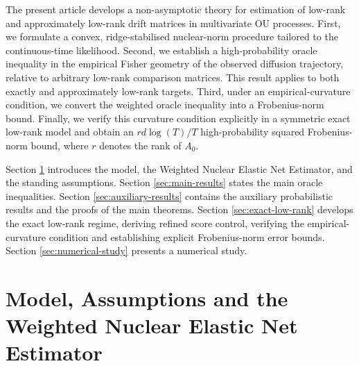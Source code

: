 \documentclass[11pt]{article}
\begin{document}

The present article develops a non-asymptotic theory for estimation of low-rank and approximately low-rank drift matrices in multivariate OU processes. First, we formulate a convex, ridge-stabilised nuclear-norm procedure
tailored to the continuous-time likelihood. Second, we establish a high-probability oracle inequality in the empirical Fisher geometry of the observed diffusion trajectory, relative to arbitrary low-rank comparison
matrices. This result applies to both exactly and approximately low-rank targets. Third, under an empirical-curvature condition, we convert the weighted oracle inequality into a Frobenius-norm bound. Finally, we verify this curvature condition explicitly in a symmetric exact low-rank model and obtain an $rd\log(T)/T$ high-probability squared Frobenius-norm bound, where $r$ denotes the rank of $A_0$.

Section \ref{sec:model-estimator} introduces the model, the Weighted Nuclear Elastic Net Estimator, and the standing assumptions.  Section \ref{sec:main-results} states the main oracle inequalities.  Section \ref{sec:auxiliary-results} contains the auxiliary probabilistic results and the proofs of the main theorems.  Section \ref{sec:exact-low-rank} develops the exact low-rank regime, deriving refined score control, verifying the empirical-curvature condition and establishing explicit Frobenius-norm error bounds.  Section \ref{sec:numerical-study} presents a numerical study.

\section{Model, Assumptions and the Weighted Nuclear Elastic Net Estimator}
\label{sec:model-estimator}
\end{document}
